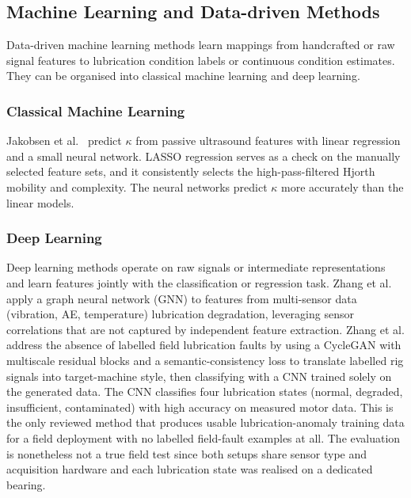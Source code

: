 \subsection{Machine Learning and Data-driven Methods}
\label{subsec:sp_ml}
Data-driven machine learning methods learn mappings from handcrafted or raw signal features to lubrication condition labels or continuous condition estimates. They can be organised into classical machine learning and deep learning.

\subsubsection{Classical Machine Learning}
\label{subsubsec:classical_ml}
Jakobsen et al.\ \cite{jakobsen_detecting_2023} predict $\kappa$ from passive ultrasound features with linear regression and a small neural network. LASSO regression serves as a check on the manually selected feature sets, and it consistently selects the high-pass-filtered Hjorth mobility and complexity. The neural networks predict $\kappa$ more accurately than the linear models.

\subsubsection{Deep Learning}
\label{subsubsec:dl}
Deep learning methods operate on raw signals or intermediate representations and learn features jointly with the classification or regression task. Zhang et al. \cite{zhang_graph-data-based_2024} apply a graph neural network (GNN) to features from multi-sensor data (vibration, AE, temperature) lubrication degradation, leveraging sensor correlations that are not captured by independent feature extraction. Zhang et al. \cite{zhang_interpretable_2026} address the absence of labelled field lubrication faults by using a CycleGAN with multiscale residual blocks and a semantic-consistency loss to translate labelled rig signals into target-machine style, then classifying with a CNN trained solely on the generated data. The CNN classifies four lubrication states (normal, degraded, insufficient, contaminated) with high accuracy on measured motor data. This is the only reviewed method that produces usable lubrication-anomaly training data for a field deployment with no labelled field-fault examples at all. The evaluation is nonetheless not a true field test since both setups share sensor type and acquisition hardware and each lubrication state was realised on a dedicated bearing.

